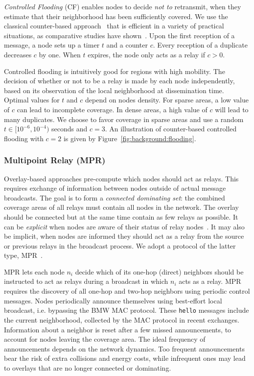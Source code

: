 \emph{Controlled Flooding} (CF) enables nodes to decide \emph{not to} retransmit, when they estimate that their neighborhood has been sufficiently covered.
We use the classical counter-based approach~\citep{BroadcastStormProblem} that is efficient in a variety of practical situations, as comparative studies have shown~\citep{DensityMobDrivenEval,Williams2002}.
Upon the first reception of a message, a node sets up a timer $t$ and a counter $c$.
Every reception of a duplicate decreases $c$ by one.
When $t$ expires, the node only acts as a relay if $c>0$.

Controlled flooding is intuitively good for regions with high mobility.
The decision of whether or not to be a relay is made by each node independently, based on its observation of the local neighborhood at dissemination time.
Optimal values for $t$ and $c$ depend on nodes density.
For sparse areas, a low value of $c$ can lead to incomplete coverage.
In dense areas, a high value of $c$ will lead to many duplicates.
We choose to favor coverage in sparse areas and use a random $t \in [10^{-6}, 10^{-4})$ seconds and $c=3$.
An illustration of counter-based controlled flooding with $c=2$ is given by Figure~\ref{fig:background:flooding}.

\subsubsection{Multipoint Relay (MPR)}
\label{sec:background:broadcast:overlay}



Overlay-based approaches pre-compute which nodes should act as relays.
This requires exchange of information between nodes outside of actual message broadcasts.
The goal is to form a \emph{connected dominating set}:
the combined coverage areas of all relays must contain all nodes in the network.
The overlay should be connected but at the same time contain as few relays as possible.
It can be \emph{explicit} when nodes are aware of their status of relay nodes~\citep{stojmenovic-cds,Nikolov2015}.
It may also be implicit, when nodes are informed they should act as a relay from the source or previous relays in the broadcast process.
We adopt a protocol of the latter type, MPR~\citep{mpr}.

MPR lets each node $n_i$ decide which of its one-hop (direct) neighbors should be instructed to act as relays during a broadcast in which $n_i$ acts as a relay.
MPR requires the discovery of all one-hop and two-hop neighbors using periodic control messages.
Nodes periodically announce themselves using best-effort local broadcast, i.e. bypassing the BMW MAC protocol.
These \texttt{hello} messages include the current neighborhood, collected by the MAC protocol in recent exchanges.
Information about a neighbor is reset after a few missed announcements, to account for nodes leaving the coverage area.
The ideal frequency of announcements depends on the network dynamics.
Too frequent announcements bear the risk of extra collisions and energy costs, while infrequent ones may lead to overlays that are no longer connected or dominating.

